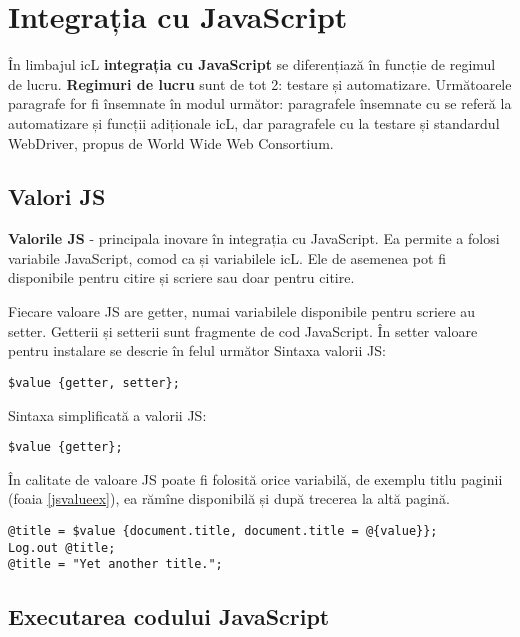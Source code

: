 \section{Integrația cu JavaScript}

În limbajul icL {\bf integrația cu JavaScript} se diferențiază în funcție de regimul de lucru. {\bf Regimuri de lucru} sunt de tot 2: testare și automatizare. Următoarele paragrafe for fi însemnate în modul următor: paragrafele însemnate cu \code{[icL]} se referă la automatizare și funcții adiționale icL, dar paragrafele cu \code{[w3c]} la testare și standardul WebDriver, propus de World Wide Web Consortium.

\subsection{Valori JS}

{\bf Valorile JS} - principala inovare în integrația cu JavaScript. Ea permite a folosi variabile JavaScript, comod ca și variabilele icL. Ele de asemenea pot fi disponibile pentru citire și scriere sau doar pentru citire.

Fiecare valoare JS are getter, numai variabilele disponibile pentru scriere au setter. Getterii și setterii sunt fragmente de cod JavaScript. În setter valoare pentru instalare se descrie în felul următor  Sintaxa valorii JS:
\begin{lstlisting}[numbers=none]
$value {getter, setter};
\end{lstlisting}

Sintaxa simplificată a valorii JS:
\begin{lstlisting}[numbers=none]
$value {getter};
\end{lstlisting}

În calitate de valoare JS poate fi folosită orice variabilă, de exemplu titlu paginii (foaia \ref{jsvalueex}), ea rămîne disponibilă și după trecerea la altă pagină.

\begin{lstlisting}[caption=Folosirea valorii JS, label=jsvalueex]
@title = $value {document.title, document.title = @{value}};
Log.out @title;
@title = "Yet another title.";
\end{lstlisting}

\subsection{Executarea codului JavaScript}

